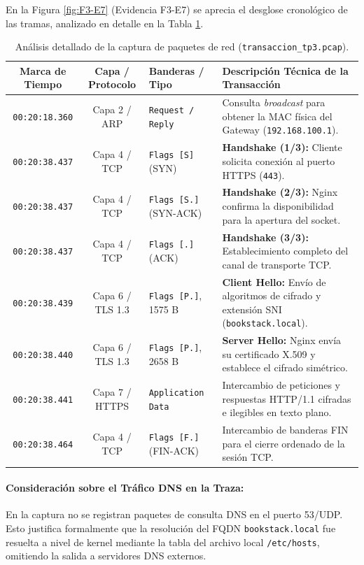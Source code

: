 \documentclass[12pt,a4paper]{article}
\begin{document}
En la Figura \ref{fig:F3-E7} (Evidencia F3-E7) se aprecia el desglose cronológico de las tramas, analizado en detalle en la Tabla \ref{tab:analisis_tcpdump}.

\begin{table}[h!]
\centering
\small
{}
\begin{tabular}{|c|c|p{3.2cm}|p{5.8cm}|}
\hline
\rowcolor{NavyPrimary} \color{white}\textbf{Marca de Tiempo} & \color{white}\textbf{Capa / Protocolo} & \color{white}\textbf{Banderas / Tipo} & \color{white}\textbf{Descripción Técnica de la Transacción} \\ \hline
\texttt{00:20:18.360} & Capa 2 / ARP & \texttt{Request / Reply} & Consulta \textit{broadcast} para obtener la MAC física del Gateway (\texttt{192.168.100.1}). \\ \hline
\texttt{00:20:38.437} & Capa 4 / TCP & \texttt{Flags [S]} (SYN) & \textbf{Handshake (1/3):} Cliente solicita conexión al puerto HTTPS (\texttt{443}). \\ \hline
\texttt{00:20:38.437} & Capa 4 / TCP & \texttt{Flags [S.]} (SYN-ACK) & \textbf{Handshake (2/3):} Nginx confirma la disponibilidad para la apertura del socket. \\ \hline
\texttt{00:20:38.437} & Capa 4 / TCP & \texttt{Flags [.]} (ACK) & \textbf{Handshake (3/3):} Establecimiento completo del canal de transporte TCP. \\ \hline
\texttt{00:20:38.439} & Capa 6 / TLS 1.3 & \texttt{Flags [P.]}, 1575 B & \textbf{Client Hello:} Envío de algoritmos de cifrado y extensión SNI (\texttt{bookstack.local}). \\ \hline
\texttt{00:20:38.440} & Capa 6 / TLS 1.3 & \texttt{Flags [P.]}, 2658 B & \textbf{Server Hello:} Nginx envía su certificado X.509 y establece el cifrado simétrico. \\ \hline
\texttt{00:20:38.441} & Capa 7 / HTTPS & \texttt{Application Data} & Intercambio de peticiones y respuestas HTTP/1.1 cifradas e ilegibles en texto plano. \\ \hline
\texttt{00:20:38.464} & Capa 4 / TCP & \texttt{Flags [F.]} (FIN-ACK) & Intercambio de banderas FIN para el cierre ordenado de la sesión TCP. \\ \hline
\end{tabular}
\caption{Análisis detallado de la captura de paquetes de red (\texttt{transaccion\_tp3.pcap}).}
\label{tab:analisis_tcpdump}
\end{table}

\paragraph{Consideración sobre el Tráfico DNS en la Traza:}
En la captura no se registran paquetes de consulta DNS en el puerto 53/UDP. Esto justifica formalmente que la resolución del FQDN \texttt{bookstack.local} fue resuelta a nivel de kernel mediante la tabla del archivo local \texttt{/etc/hosts}, omitiendo la salida a servidores DNS externos.
\end{document}
